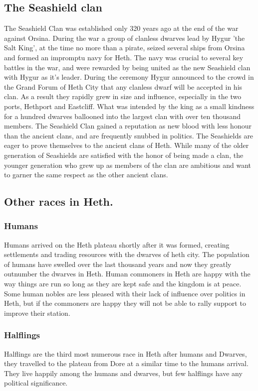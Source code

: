 \documentclass[10pt,twoside,twocolumn,openany,justified,bg=full,nomultitoc]{dndbook}
\begin{document}
\subsection{The Seashield clan}
\label{sec-2-2-2}
The Seashield Clan was established only 320 years ago at the end of the war against Orsina. During the war a group of clanless dwarves lead by Hygur 'the Salt King', at the time no more than a pirate, seized several ships from Orsina and formed an impromptu navy for Heth.
The navy was crucial to several key battles in the war, and were rewarded by being united as the new Seashield clan with Hygur as it's leader. During the ceremony Hygur announced to the crowd in the Grand Forum of Heth City that any clanless dwarf will be accepted in his clan. As a result they rapidly grew in size and influence, especially in the two ports, Hethport and Eastcliff. What was intended by the king as a small kindness for a hundred dwarves ballooned into the largest clan with over ten thousand members.
The Seashield Clan gained a reputation as new blood with less honour than the ancient clans, and are frequently snubbed in politics. 
The Seashields are eager to prove themselves to the ancient clans of Heth. While many of the older generation of Seashields are satisfied with the honor of being made a clan, the younger generation who grew up as members of the clan are ambitious and want to garner the same respect as the other ancient clans.


\subsection{Other races in Heth.}
\label{sec-2-2-3}

\subsubsection{Humans}
\label{sec-2-2-3-1}
Humans arrived on the Heth plateau shortly after it was formed, creating settlements and trading resources with the dwarves of heth city. The population of humans have swelled over the last thousand years and now they greatly outnumber the dwarves in Heth. Human commoners in Heth are happy with the way things are run so long as they are kept safe and the kingdom is at peace. Some human nobles are less pleased with their lack of influence over politics in Heth, but if the commoners are happy they will not be able to rally support to improve their station.

\subsubsection{Halflings}
\label{sec-2-2-3-2}
Halflings are the third most numerous race in Heth after humans and Dwarves, they travelled to the plateau from Dore at a similar time to the humans arrival. They live happily among the humans and dwarves, but few halflings have any political significance.  
\end{document}
